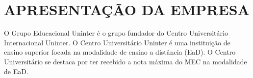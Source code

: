 \section{APRESENTAÇÃO DA EMPRESA}
O Grupo Educacional Uninter é o grupo fundador do Centro Universitário Internacional Uninter.
O Centro Universitário Uninter é uma instituição de ensino superior focada na modalidade de ensino a distância (EaD).
O Centro Universitário se destaca por ter recebido a nota máxima do MEC na modalidade de EaD.


